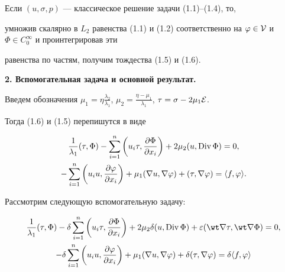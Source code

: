 \begin{notenonum}


Если $(u, \sigma, p)$ --- классическое решение задачи (1.1)--(1.4), то,


умножив скалярно в $L_2$ равенства (1.1) и (1.2) соответственно на $\varphi\in


\cal{V}$ и $\Phi\in C^{\infty}_0$ и проинтегрировав эти


равенства по частям, получим тождества (1.5) и (1.6).


\end{notenonum}





\addtocounter{section}{1}


\setcounter{equation}{0}





{\bf 2. Вспомогательная задача и основной результат.}


Введем обозначения $\mu_1 = \eta\frac


{\lambda_2}{\lambda_1}$, $\mu_2 = \frac


{\eta-\mu_1}{\lambda_1}$, $\tau = \sigma- 2\mu_1\cal{E}$.


Тогда (1.6) и (1.5) перепишутся в виде


\begin{gather}


\frac{1}{\lambda_1}(\tau,\Phi)-\sum^n_{i=1}\bigg(u_i\tau, \frac


{\partial\Phi}{\partial x_i}\bigg)+ 2\mu_2(u, \Div \Phi)=0,\\


%


-\sum^n_{i=1}\bigg(u_i u, \frac {\partial\varphi}{\partial


x_i}\bigg)+\mu_1(\nabla u, \nabla \varphi)+(\tau,\nabla \varphi)=


\langle f, \varphi\rangle.


\end{gather}





Рассмотрим следующую вспомогательную задачу:


\begin{gather}


\frac {1}{\lambda_1}(\tau, \Phi)- \delta \sum^n_{i=1}\bigg(u_i


\tau,\frac {\partial\Phi}{\partial x_i}\bigg)+ 2\mu_2\delta(u,\Div


\Phi)+\varepsilon(\wt\nabla\tau,\wt\nabla\Phi)=0,\\


%


-\delta\sum\limits^n_{i=1}\bigg(u_i u,\frac {\partial \varphi


}{\partial x_i}\bigg)+ \mu_1(\nabla u, \nabla\varphi)+\delta(\tau,


\nabla \varphi)=\delta\langle f,\varphi\rangle


\end{gather}


